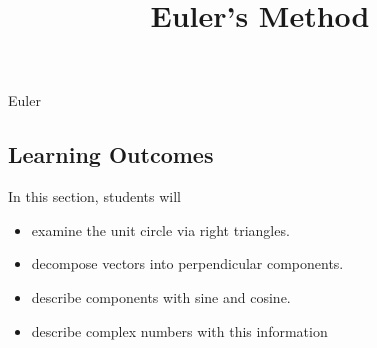 \documentclass{ximera}
\title{Euler's Method}
\begin{document}
\begin{abstract}
\end{abstract}
\maketitle


Euler







\subsection{Learning Outcomes}


\begin{sectionOutcomes}
In this section, students will 

\begin{itemize}
\item examine the unit circle via right triangles.
\item decompose vectors into perpendicular components.
\item describe components with sine and cosine.
\item describe complex numbers with this information
\end{itemize}
\end{sectionOutcomes}
\end{document}
